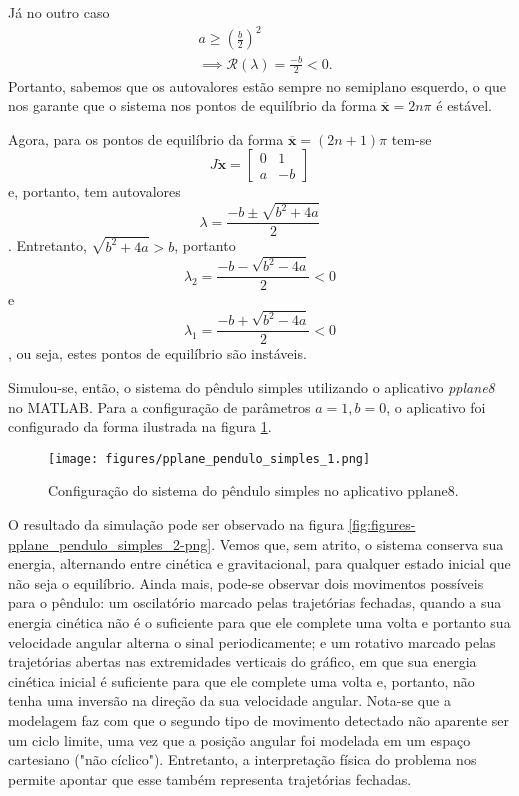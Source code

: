 \documentclass[a4paper]{report}
\begin{document}
Já no outro caso 
\begin{align*}
    &a \ge  \left(\frac{b}{2}\right)^2 \\
    &\implies \mathcal{R}(\lambda) = \frac{-b}{2} < 0
.\end{align*}
Portanto, sabemos que os autovalores estão sempre no semiplano esquerdo, o que nos garante que o sistema nos pontos de equilíbrio da forma $\bm{\overline{x}} = 2n\pi$ é estável.

Agora, para os pontos de equilíbrio da forma $\bm{\overline{x}} = (2n+1)\pi$ tem-se \[
    J\bm{\dot{x}} = \begin{bmatrix} 0 & 1 \\ a & -b \end{bmatrix} 
\] e, portanto, tem autovalores \[
\lambda = \frac{-b \pm \sqrt{b^2 +4a} }{2}
\]. Entretanto, $\sqrt{b^2 +4a} >  b$, portanto \[
    \lambda_2 = \frac{-b - \sqrt{b^2 -4a} }{2} <  0
\] e \[
    \lambda_1 = \frac{-b + \sqrt{b^2 -4a} }{2} <  0
\], ou seja, estes pontos de equilíbrio são instáveis.

Simulou-se, então, o sistema do pêndulo simples utilizando o aplicativo \emph{pplane8} no MATLAB. Para a configuração de parâmetros $a=1, b=0$, o aplicativo foi configurado da forma ilustrada na figura \ref{fig:figures-pplane_pendulo_simples_1-png}.

\begin{figure}[h]
    \centering
    \texttt{[image: figures/pplane\_pendulo\_simples\_1.png]}
    \caption{Configuração do sistema do pêndulo simples no aplicativo pplane8.}
    \label{fig:figures-pplane_pendulo_simples_1-png}
\end{figure}

O resultado da simulação pode ser observado na figura \ref{fig:figures-pplane_pendulo_simples_2-png}. Vemos que, sem atrito, o sistema conserva sua energia, alternando entre cinética e gravitacional, para qualquer estado inicial que não seja o equilíbrio. Ainda mais, pode-se observar dois movimentos possíveis para o pêndulo: um oscilatório marcado pelas trajetórias fechadas, quando a sua energia cinética não é o suficiente para que ele complete uma volta e portanto sua velocidade angular alterna o sinal periodicamente; e um rotativo marcado pelas trajetórias abertas nas extremidades verticais do gráfico, em que sua energia cinética inicial é suficiente para que ele complete uma volta e, portanto, não tenha uma inversão na direção da sua velocidade angular. Nota-se que a modelagem faz com que o segundo tipo de movimento detectado não aparente ser um ciclo limite, uma vez que a posição angular foi modelada em um espaço cartesiano ("não cíclico"). Entretanto, a interpretação física do problema nos permite apontar que esse também representa trajetórias fechadas.
\end{document}
